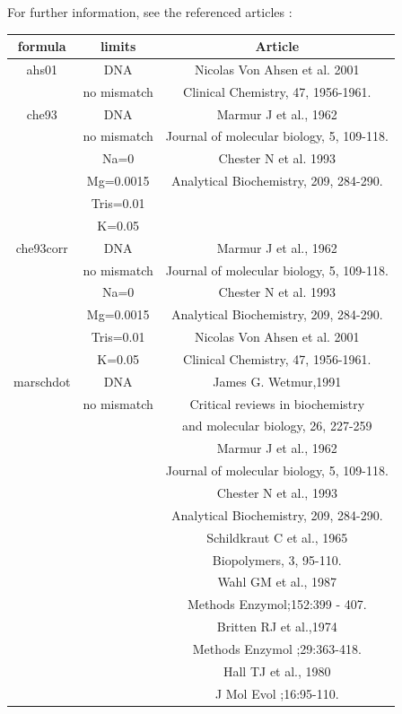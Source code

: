 \documentclass{article}
\begin{document}
For further information, see the referenced articles :
\begin{table}[hc]
\begin{tabular}[h]{| c | c | c |}
\textbf{formula} & \textbf{limits} & \textbf{Article} \\ 
\hline
ahs01 & DNA & Nicolas Von Ahsen et al. 2001\\
 & no mismatch & Clinical Chemistry, 47, 1956-1961. \\
 \hline
che93 & DNA & Marmur J et al., 1962\\
 & no mismatch & Journal of molecular biology, 5, 109-118. \\
 & Na=0 & Chester N et al. 1993\\
 & Mg=0.0015 & Analytical Biochemistry, 209, 284-290. \\
 & Tris=0.01 & \\ 
 & K=0.05 & \\
 \hline
che93corr & DNA & Marmur J et al., 1962\\
 & no mismatch & Journal of molecular biology, 5, 109-118. \\
 & Na=0 & Chester N et al. 1993\\
 & Mg=0.0015 & Analytical Biochemistry, 209, 284-290. \\
 & Tris=0.01 & Nicolas Von Ahsen et al. 2001\\
 & K=0.05 & Clinical Chemistry, 47, 1956-1961. \\
 \hline
marschdot & DNA & James G. Wetmur,1991\\
 & no mismatch & Critical reviews in biochemistry \\
 & & and molecular biology, 26, 227-259 \\
 & & Marmur J et al., 1962\\
 & & Journal of molecular biology, 5, 109-118. \\
 & & Chester N et al., 1993\\
 & & Analytical Biochemistry, 209, 284-290. \\
 & & Schildkraut C et al., 1965\\
 & & Biopolymers, 3, 95-110. \\
 & & Wahl GM et al., 1987\\
 & & Methods Enzymol;152:399 - 407. \\
 & & Britten RJ et al.,1974\\
 & & Methods Enzymol ;29:363-418. \\
 & & Hall TJ et al., 1980\\
 & & J Mol Evol ;16:95-110.\\

\end{tabular}
\end{table}
\end{document}
